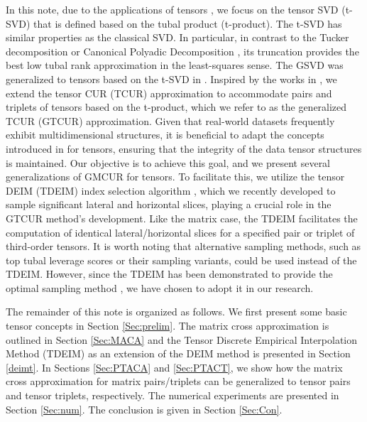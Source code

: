 \documentclass[preprint,12pt]{elsarticle}
\theoremstyle{definition}
\begin{document}
In this note, due to the applications of tensors \cite{elden2019solving,asante2021matrix,asante2023image}, we focus on the tensor SVD (t-SVD) \cite{kilmer2013third} that is defined based on the tubal product (t-product). The t-SVD has similar properties as the classical SVD. In particular, in contrast to the Tucker decomposition \cite{tucker1964extension,tucker1966some} or Canonical Polyadic Decomposition \cite{hitchcock1927expression,hitchcock1928multiple}, its truncation provides the best low tubal rank approximation in the least-squares sense. The GSVD was generalized to tensors based on the t-SVD in \cite{he2021generalized,zhang2021cs}.
Inspired by the works in \cite{gidisu2022generalized,gidisu2022restricted}, we extend the tensor CUR (TCUR) approximation \cite{tarzanagh2018fast} to accommodate pairs and triplets of tensors based on the t-product, which we refer to as the generalized TCUR (GTCUR) approximation. Given that real-world datasets frequently exhibit multidimensional structures, it is beneficial to adapt the concepts introduced in \cite{gidisu2022generalized,gidisu2022hybrid} for tensors, ensuring that the integrity of the data tensor structures is maintained. Our objective is to achieve this goal, and we present several generalizations of GMCUR for tensors. To facilitate this, we utilize the tensor DEIM (TDEIM) index selection algorithm \cite{ahmadi2024robust}, which we recently developed to sample significant lateral and horizontal slices, playing a crucial role in the GTCUR method's development. Like the matrix case, the TDEIM facilitates the computation of identical lateral/horizontal slices for a specified pair or triplet of third-order tensors. It is worth noting that alternative sampling methods, such as top tubal leverage scores \cite{mahoney2011randomized,tarzanagh2018fast} or their sampling variants, could be used instead of the TDEIM. However, since the TDEIM has been demonstrated to provide the optimal sampling method \cite{sorensen2016deim,ahmadi2024robust}, we have chosen to adopt it in our research.

The remainder of this note is organized as follows. We first present some basic tensor concepts in Section \ref{Sec:prelim}. The matrix cross approximation is outlined in Section \ref{Sec:MACA} and the Tensor Discrete Empirical Interpolation Method (TDEIM) as an extension of the DEIM method is presented in Section \ref{deimt}. In Sections \ref{Sec:PTACA} and \ref{Sec:PTACT}, we show how the matrix cross approximation for matrix pairs/triplets can be generalized to tensor pairs and tensor triplets, respectively. The numerical experiments are presented in Section \ref{Sec:num}. The conclusion is given in Section \ref{Sec:Con}.
\end{document}
